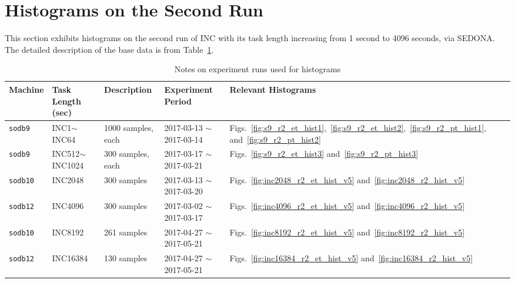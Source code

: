 \section{Histograms on the Second Run~\label{sec:sodb9_r2_hist}} 
This section exhibits histograms on the second run of 
INC with its task length increasing from 1 second to 4096 seconds, via SEDONA. 
The detailed description of the base data is from Table~\ref{tab:exp_notes2}.

\begin{table}[h]
\begin{center}
\begin{tabular}{|p{2cm}|p{3cm}|p{3cm}|p{4cm}|p{3.5cm}|} \hline
Machine & Task Length (sec) & Description & Experiment Period & Relevant \linebreak Histograms\\ \hline
{\tt sodb9} &  INC1$\sim$INC64 & 1000 samples, each & 2017-03-13 $\sim$ 2017-03-14 & Figs.~\ref{fig:s9_r2_et_hist1},~\ref{fig:s9_r2_et_hist2},~\ref{fig:s9_r2_pt_hist1}, and~\ref{fig:s9_r2_pt_hist2}\\ \hline
{\tt sodb9} &  INC512$\sim$INC1024 & 300 samples, each & 2017-03-17 $\sim$ 2017-03-21 & 
Figs.~\ref{fig:s9_r2_et_hist3} and~\ref{fig:s9_r2_pt_hist3}\\ \hline
{\tt sodb10} & INC2048 & 300 samples & 2017-03-13 $\sim$ 2017-03-20 & Figs.~\ref{fig:inc2048_r2_et_hist_v5} and~\ref{fig:inc2048_r2_hist_v5}\\ \hline
{\tt sodb12} & INC4096 & 300 samples & 2017-03-02 $\sim$ 2017-03-17 & Figs.~\ref{fig:inc4096_r2_et_hist_v5} and~\ref{fig:inc4096_r2_hist_v5}\\ \hline
{\tt sodb10} & INC8192& 261 samples & 2017-04-27 $\sim$ 2017-05-21 & Figs.~\ref{fig:inc8192_r2_et_hist_v5} and~\ref{fig:inc8192_r2_hist_v5}\\ \hline
{\tt sodb12} & INC16384& 130 samples & 2017-04-27 $\sim$ 2017-05-21 & Figs.~\ref{fig:inc16384_r2_et_hist_v5} and~\ref{fig:inc16384_r2_hist_v5}\\ \hline
\end{tabular}
\end{center}
\vspace{-.2in}
\caption{Notes on experiment runs used for histograms\label{tab:exp_notes2}}
\end{table}


